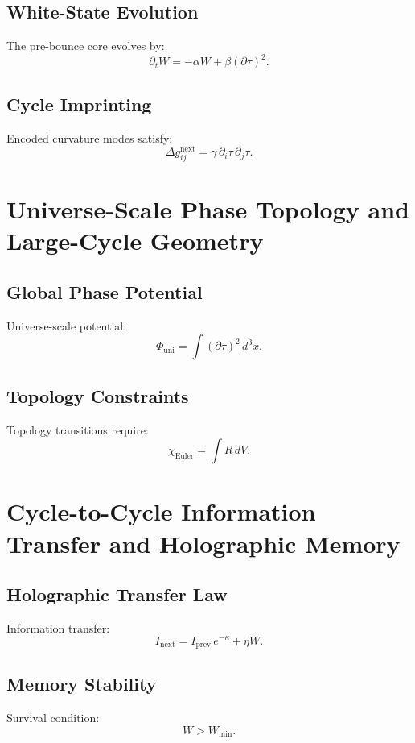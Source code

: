\section{White-State Evolution}
The pre-bounce core evolves by:
\[
\partial_t W = -\alpha W + \beta (\partial\tau)^2.
\]

\section{Cycle Imprinting}
Encoded curvature modes satisfy:
\[
\Delta g_{ij}^{\mathrm{next}} = \gamma\, \partial_i\tau\,\partial_j\tau.
\]

\chapter{Universe-Scale Phase Topology and Large-Cycle Geometry}

\section{Global Phase Potential}
Universe-scale potential:
\[
\Phi_{\mathrm{uni}} = \int (\partial\tau)^2\, d^3x.
\]

\section{Topology Constraints}
Topology transitions require:
\[
\chi_{\mathrm{Euler}} = \int R\, dV.
\]

\chapter{Cycle-to-Cycle Information Transfer and Holographic Memory}

\section{Holographic Transfer Law}
Information transfer:
\[
I_{\mathrm{next}} = I_{\mathrm{prev}}\, e^{-\kappa} + \eta W.
\]

\section{Memory Stability}
Survival condition:
\[
W > W_{\mathrm{min}}.
\]
